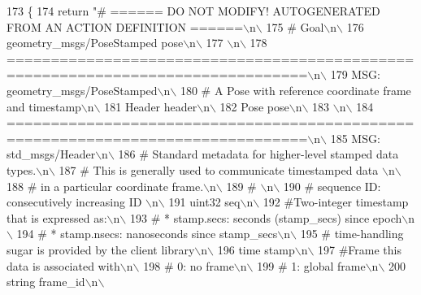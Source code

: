 \begin{DoxyCode}
173   \{
174     \textcolor{keywordflow}{return} \textcolor{stringliteral}{"# ====== DO NOT MODIFY! AUTOGENERATED FROM AN ACTION DEFINITION ======\(\backslash\)n\(\backslash\)}
175 \textcolor{stringliteral}{# Goal\(\backslash\)n\(\backslash\)}
176 \textcolor{stringliteral}{geometry\_msgs/PoseStamped pose\(\backslash\)n\(\backslash\)}
177 \textcolor{stringliteral}{\(\backslash\)n\(\backslash\)}
178 \textcolor{stringliteral}{================================================================================\(\backslash\)n\(\backslash\)}
179 \textcolor{stringliteral}{MSG: geometry\_msgs/PoseStamped\(\backslash\)n\(\backslash\)}
180 \textcolor{stringliteral}{# A Pose with reference coordinate frame and timestamp\(\backslash\)n\(\backslash\)}
181 \textcolor{stringliteral}{Header header\(\backslash\)n\(\backslash\)}
182 \textcolor{stringliteral}{Pose pose\(\backslash\)n\(\backslash\)}
183 \textcolor{stringliteral}{\(\backslash\)n\(\backslash\)}
184 \textcolor{stringliteral}{================================================================================\(\backslash\)n\(\backslash\)}
185 \textcolor{stringliteral}{MSG: std\_msgs/Header\(\backslash\)n\(\backslash\)}
186 \textcolor{stringliteral}{# Standard metadata for higher-level stamped data types.\(\backslash\)n\(\backslash\)}
187 \textcolor{stringliteral}{# This is generally used to communicate timestamped data \(\backslash\)n\(\backslash\)}
188 \textcolor{stringliteral}{# in a particular coordinate frame.\(\backslash\)n\(\backslash\)}
189 \textcolor{stringliteral}{# \(\backslash\)n\(\backslash\)}
190 \textcolor{stringliteral}{# sequence ID: consecutively increasing ID \(\backslash\)n\(\backslash\)}
191 \textcolor{stringliteral}{uint32 seq\(\backslash\)n\(\backslash\)}
192 \textcolor{stringliteral}{#Two-integer timestamp that is expressed as:\(\backslash\)n\(\backslash\)}
193 \textcolor{stringliteral}{# * stamp.secs: seconds (stamp\_secs) since epoch\(\backslash\)n\(\backslash\)}
194 \textcolor{stringliteral}{# * stamp.nsecs: nanoseconds since stamp\_secs\(\backslash\)n\(\backslash\)}
195 \textcolor{stringliteral}{# time-handling sugar is provided by the client library\(\backslash\)n\(\backslash\)}
196 \textcolor{stringliteral}{time stamp\(\backslash\)n\(\backslash\)}
197 \textcolor{stringliteral}{#Frame this data is associated with\(\backslash\)n\(\backslash\)}
198 \textcolor{stringliteral}{# 0: no frame\(\backslash\)n\(\backslash\)}
199 \textcolor{stringliteral}{# 1: global frame\(\backslash\)n\(\backslash\)}
200 \textcolor{stringliteral}{string frame\_id\(\backslash\)n\(\backslash\)}

\end{DoxyCode}
